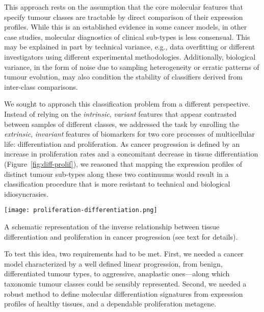 
This approach rests on the assumption that the core molecular features that
specify tumour classes are tractable by direct comparison of their expression
profiles.  While this is an established evidence in some cancer
models,\cite{haibe-kains_three-gene_2012,markert_molecular_2011} in other case
studies, molecular diagnostics of clinical sub-types is less
consensual.\cite{travis_new_2013,nikiforov_molecular_2011} This may be explained
in part by technical variance, e.g., data overfitting or different investigators
using different experimental methodologies.\cite{weigelt_challenges_2012}
Additionally, biological variance, in the form of noise due to sampling
heterogeneity or erratic patterns of tumour evolution, may also condition the
stability of classifiers derived from inter-class comparisons.

We sought to approach this classification problem from a different perspective.
Instead of relying on the \emph{intrinsic}, \emph{variant} features that appear
contrasted between samples of different classes, we addressed the task by
enrolling the \emph{extrinsic}, \emph{invariant} features of biomarkers for two
core processes of multicellular life: differentiation and proliferation.  As
cancer progression is defined by an increase in proliferation rates and a
concomitant decrease in tissue differentiation (Figure~\ref{fig:diff-prolif}),
we reasoned that mapping the expression profiles of distinct tumour sub-types
along these two continuums would result in a classification procedure that is
more resistant to technical and biological idiosyncrasies.

\begin{marginfigure}%
  \begin{center}
    \texttt{[image: proliferation-differentiation.png]}
    \caption[Differentiation and proliferation in cancer]{A schematic
      representation of the inverse relationship between tissue differentiation
      and proliferation in cancer progression (see text for details).}
    \label{fig:diff-prolif}%
  \end{center}
\end{marginfigure}%

To test this idea, two requirements had to be met.  First, we needed a cancer
model characterized by a well defined linear progression, from benign,
differentiated tumour types, to aggressive, anaplastic ones---along which
taxonomic tumour classes could be sensibly represented.  Second, we needed a
robust method to define molecular differentiation signatures from expression
profiles of healthy tissues, and a dependable proliferation metagene.

